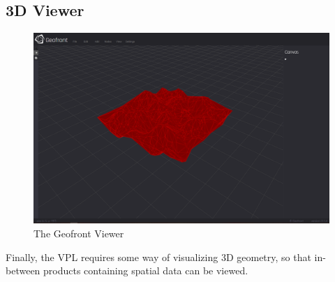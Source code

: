 





\subsection{3D Viewer}

\begin{figure}
  \centering
  \graphicspath{ {../../assets/images/implementation/} }
  \includegraphics[width=\linewidth]{viewer.png}
  \caption[Geofront viewer]{The Geofront Viewer}
  \label{fig:geofront-viewer}
\end{figure}

Finally, the VPL requires some way of visualizing 3D geometry, so that in-between products containing spatial data can be viewed. 

